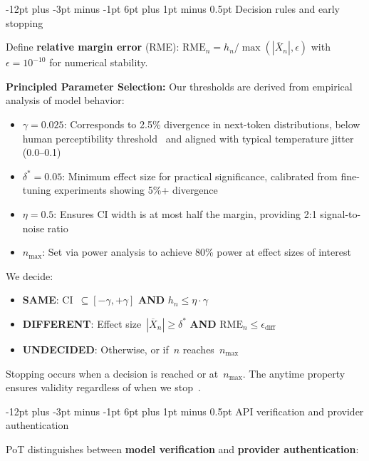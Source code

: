 \documentclass[11pt]{article}
\makeatletter
\renewcommand\subsection{\@startsection{subsection}{2}{\z@}%
  {-12pt plus -3pt minus -1pt}%
  {6pt plus 1pt minus 0.5pt}%
  {\normalfont\large\bfseries}}
\makeatother
\begin{document}
\subsection{Decision rules and early stopping}

Define \textbf{relative margin error} (RME): $\mathrm{RME}_n = h_n / \max(|\overline{X}_n|, \epsilon)$ with~$\epsilon = 10^{-10}$ for numerical stability. 

\textbf{Principled Parameter Selection:} Our thresholds are derived from empirical analysis of model behavior:
\begin{itemize}
\item $\gamma=0.025$: Corresponds to 2.5\% divergence in next-token distributions, below human perceptibility threshold~\cite{gehrmann2019gltr} and aligned with typical temperature jitter (0.0--0.1)
\item $\delta^*=0.05$: Minimum effect size for practical significance, calibrated from fine-tuning experiments showing 5\%+ divergence
\item $\eta=0.5$: Ensures CI width is at most half the margin, providing 2:1 signal-to-noise ratio
\item $n_{\max}$: Set via power analysis to achieve 80\% power at effect sizes of interest
\end{itemize}

We decide:
\begin{itemize}
\item \textbf{SAME}: CI~$\subseteq [-\gamma, +\gamma]$ \textbf{AND} $h_n \leq \eta \cdot \gamma$
\item \textbf{DIFFERENT}: Effect size~$|\overline{X}_n| \geq \delta^*$ \textbf{AND} $\mathrm{RME}_n \leq \epsilon_{\mathrm{diff}}$ 
\item \textbf{UNDECIDED}: Otherwise, or if~$n$ reaches~$n_{\max}$
\end{itemize}

Stopping occurs when a decision is reached or at~$n_{\max}$. The anytime property ensures validity regardless of when we stop~\cite{wald1945sprt}.

\subsection{API verification and provider authentication}
\label{sec:api-verification}

PoT distinguishes between \textbf{model verification} and \textbf{provider authentication}:
\end{document}
